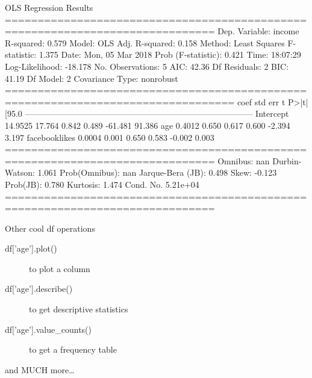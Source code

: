 \documentclass[handout]{beamer}
\begin{document}
\begin{frame}{}

\begin{lstlistingoutputtiny}
OLS Regression Results                            
==============================================================================
Dep. Variable:                 income   R-squared:                       0.579
Model:                            OLS   Adj. R-squared:                  0.158
Method:                 Least Squares   F-statistic:                     1.375
Date:                Mon, 05 Mar 2018   Prob (F-statistic):              0.421
Time:                        18:07:29   Log-Likelihood:                -18.178
No. Observations:                   5   AIC:                             42.36
Df Residuals:                       2   BIC:                             41.19
Df Model:                           2                                         
Covariance Type:            nonrobust                                         
=================================================================================
coef    std err          t      P>|t|      [95.0%
---------------------------------------------------------------------------------
Intercept        14.9525     17.764      0.842      0.489       -61.481    91.386
age               0.4012      0.650      0.617      0.600        -2.394     3.197
facebooklikes     0.0004      0.001      0.650      0.583        -0.002     0.003
==============================================================================
Omnibus:                          nan   Durbin-Watson:                   1.061
Prob(Omnibus):                    nan   Jarque-Bera (JB):                0.498
Skew:                          -0.123   Prob(JB):                        0.780
Kurtosis:                       1.474   Cond. No.                     5.21e+04
==============================================================================

\end{lstlistingoutputtiny}
	
\end{frame}




\begin{frame}[fragile]{Other cool df operations}
\begin{description}
	\item[df{['age']}.plot()] to plot a column
	\item[df{['age']}.describe()] to get descriptive statistics 
	\item[df{['age']}.value\_counts()] to get a frequency table
\end{description}
and MUCH more\ldots
	
\end{frame}
\end{document}
